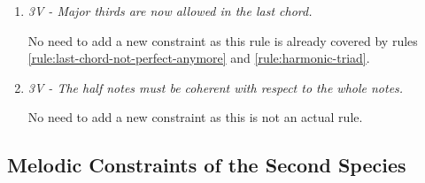 \begin{enumerate}[wide, label=\bfseries 2.H\arabic*]
\item \textit{3V - Major thirds are now allowed in the last chord.}

No need to add a new constraint as this rule is already covered by rules \ref{rule:last-chord-not-perfect-anymore} and \ref{rule:harmonic-triad}.

\item \textit{3V - The half notes must be coherent with respect to the whole notes.}

No need to add a new constraint as this is not an actual rule.

\end{enumerate}

\subsection*{Melodic Constraints of the Second Species}
